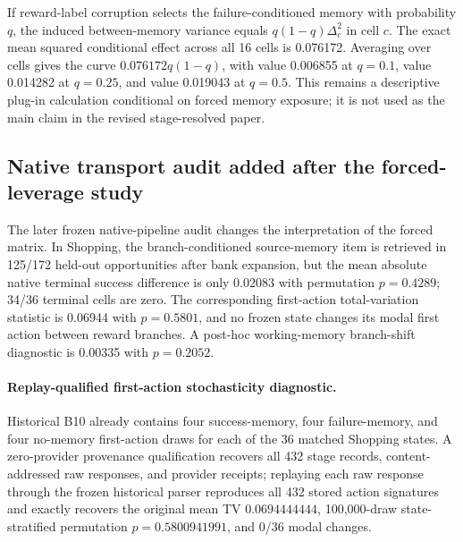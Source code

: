 If reward-label corruption selects the failure-conditioned memory with probability $q$, the induced between-memory variance equals $q(1-q)\Delta_c^2$ in cell $c$. The exact mean squared conditional effect across all 16 cells is 0.076172. Averaging over cells gives the curve $0.076172q(1-q)$, with value 0.006855 at $q=0.1$, value 0.014282 at $q=0.25$, and value 0.019043 at $q=0.5$. This remains a descriptive plug-in calculation conditional on forced memory exposure; it is not used as the main claim in the revised stage-resolved paper.

\subsection{Native transport audit added after the forced-leverage study}
The later frozen native-pipeline audit changes the interpretation of the forced matrix. In Shopping, the branch-conditioned source-memory item is retrieved in 125/172 held-out opportunities after bank expansion, but the mean absolute native terminal success difference is only 0.02083 with permutation $p=0.4289$; 34/36 terminal cells are zero. The corresponding first-action total-variation statistic is 0.06944 with $p=0.5801$, and no frozen state changes its modal first action between reward branches. A post-hoc working-memory branch-shift diagnostic is 0.00335 with $p=0.2052$.

\paragraph{Replay-qualified first-action stochasticity diagnostic.}
Historical B10 already contains four success-memory, four failure-memory, and four no-memory first-action draws for each of the 36 matched Shopping states. A zero-provider provenance qualification recovers all 432 stage records, content-addressed raw responses, and provider receipts; replaying each raw response through the frozen historical parser reproduces all 432 stored action signatures and exactly recovers the original mean TV $0.0694444444$, 100,000-draw state-stratified permutation $p=0.5800941991$, and 0/36 modal changes.

